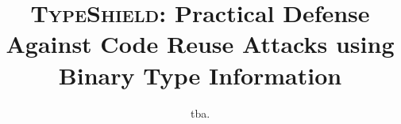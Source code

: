 \documentclass[twocolumn]{IEEEtran} %
\theoremstyle{definition}
\begin{document}

\title{\textsc{TypeShield}: Practical Defense Against Code Reuse Attacks using Binary Type Information}



\author{tba.}

\end{document}
